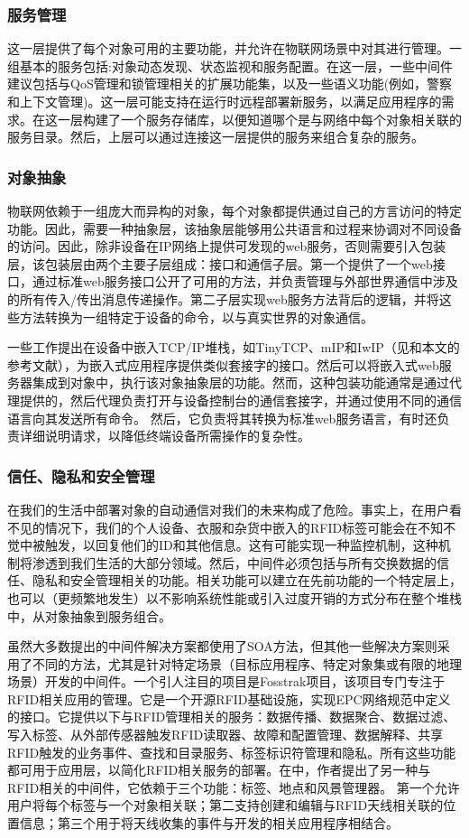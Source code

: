 \documentclass[12pt,a4paper]{article}%
\begin{document}
\subsubsection{服务管理}
这一层提供了每个对象可用的主要功能，并允许在物联网场景中对其进行管理。一组基本的服务包括:对象动态发现、状态监视和服务配置。在这一层，一些中间件建议包括与QoS管理和锁管理相关的扩展功能集，以及一些语义功能(例如，警察和上下文管理)。这一层可能支持在运行时远程部署新服务，以满足应用程序的需求。在这一层构建了一个服务存储库，以便知道哪个是与网络中每个对象相关联的服务目录。然后，上层可以通过连接这一层提供的服务来组合复杂的服务。
\subsubsection{对象抽象}
物联网依赖于一组庞大而异构的对象，每个对象都提供通过自己的方言访问的特定功能。因此，需要一种抽象层，该抽象层能够用公共语言和过程来协调对不同设备的访问。因此，除非设备在IP网络上提供可发现的web服务，否则需要引入包装层，该包装层由两个主要子层组成：接口和通信子层。第一个提供了一个web接口，通过标准web服务接口公开了可用的方法，并负责管理与外部世界通信中涉及的所有传入/传出消息传递操作。第二子层实现web服务方法背后的逻辑，并将这些方法转换为一组特定于设备的命令，以与真实世界的对象通信。

一些工作提出在设备中嵌入TCP/IP堆栈，如TinyTCP、mIP和IwIP（见和本文的参考文献），为嵌入式应用程序提供类似套接字的接口。然后可以将嵌入式web服务器集成到对象中，执行该对象抽象层的功能。然而，这种包装功能通常是通过代理提供的，然后代理负责打开与设备控制台的通信套接字，并通过使用不同的通信语言向其发送所有命令。
然后，它负责将其转换为标准web服务语言，有时还负责详细说明请求，以降低终端设备所需操作的复杂性。

\subsubsection{信任、隐私和安全管理}
在我们的生活中部署对象的自动通信对我们的未来构成了危险。事实上，在用户看不见的情况下，我们的个人设备、衣服和杂货中嵌入的RFID标签可能会在不知不觉中被触发，以回复他们的ID和其他信息。这有可能实现一种监控机制，这种机制将渗透到我们生活的大部分领域。然后，中间件必须包括与所有交换数据的信任、隐私和安全管理相关的功能。相关功能可以建立在先前功能的一个特定层上，也可以（更频繁地发生）以不影响系统性能或引入过度开销的方式分布在整个堆栈中，从对象抽象到服务组合。

虽然大多数提出的中间件解决方案都使用了SOA方法，但其他一些解决方案则采用了不同的方法，尤其是针对特定场景（目标应用程序、特定对象集或有限的地理场景）开发的中间件。一个引人注目的项目是Fosstrak项目，该项目专门专注于RFID相关应用的管理。它是一个开源RFID基础设施，实现EPC网络规范中定义的接口。它提供以下与RFID管理相关的服务：数据传播、数据聚合、数据过滤、写入标签、从外部传感器触发RFID读取器、故障和配置管理、数据解释、共享RFID触发的业务事件、查找和目录服务、标签标识符管理和隐私。所有这些功能都可用于应用层，以简化RFID相关服务的部署。在中，作者提出了另一种与RFID相关的中间件，它依赖于三个功能：标签、地点和风景管理器。
第一个允许用户将每个标签与一个对象相关联；第二支持创建和编辑与RFID天线相关联的位置信息；第三个用于将天线收集的事件与开发的相关应用程序相结合。
\end{document}
